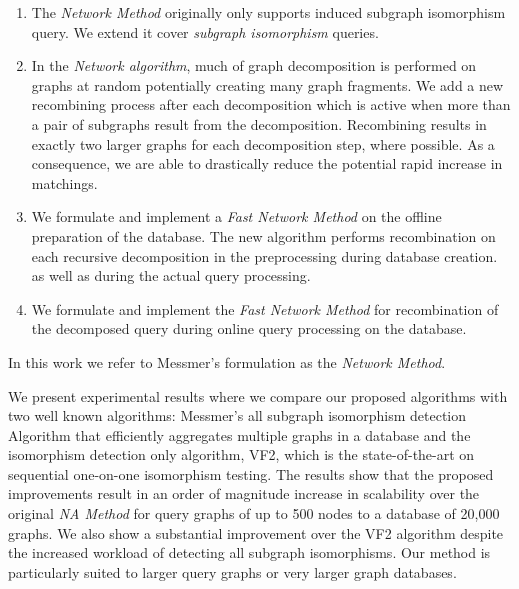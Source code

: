 \begin{enumerate}
\item The \textit{Network Method} originally only supports induced subgraph isomorphism query. We extend it  cover \textit{subgraph isomorphism} queries.
\item  In the \textit{Network algorithm}, much of graph decomposition is performed on graphs at random potentially creating many graph fragments. We add a new recombining 
process after each decomposition which is active when more than a pair of  subgraphs result from the decomposition.  Recombining results in exactly  two larger 
graphs for each decomposition step, where possible.  As a consequence, we are able to drastically reduce the potential rapid increase in matchings. 
\item We formulate and implement  a  \textit{Fast Network Method} on the offline preparation of the database. The new algorithm performs recombination 
on  each recursive decomposition in the  preprocessing during database creation. as well as during the actual query processing. 
\item We formulate and implement the \textit{Fast Network Method} for recombination of the decomposed query during  online query processing on the database.
\end{enumerate}

In this work we refer to Messmer's formulation as the \textit{Network Method}.


We present experimental results where we compare our proposed algorithms with two well known algorithms: Messmer's\cite{messmer_bunke2000} all subgraph isomorphism 
detection Algorithm that efficiently aggregates multiple graphs in a database and the isomorphism detection only algorithm, VF2\cite{cordella2001_vf2}, which is the 
state-of-the-art on sequential one-on-one isomorphism testing. The results show that the proposed improvements result in an order of magnitude increase in scalability 
over the original \textit{NA Method}  for query graphs of up to 500 nodes to a database of 20,000 graphs. We also show a substantial improvement over the VF2 
algorithm despite the increased workload of detecting all subgraph isomorphisms. Our method is particularly suited to larger query graphs or very larger graph 
databases.
